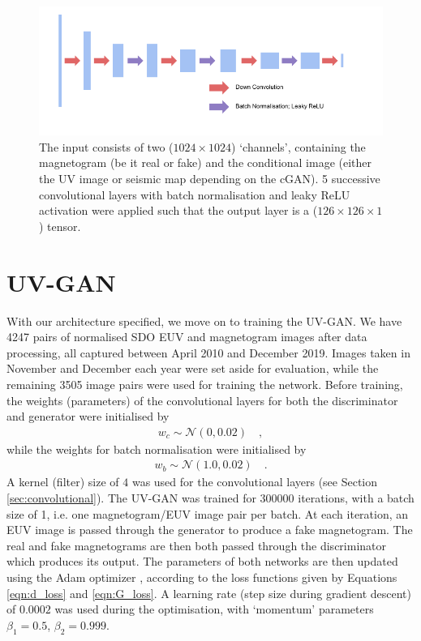 \documentclass[11pt,a4paper,onecolumn]{report}
\begin{document}
\begin{figure}
  \centering
  \includegraphics[width=\linewidth]{Descrim.pdf}
  \caption{
    The input consists of two ($1024\times 1024$) `channels', containing the
    magnetogram (be it real or fake) and the conditional image (either the UV
    image or seismic map depending on the cGAN). 5 successive convolutional
    layers with batch normalisation and leaky ReLU activation were applied such
    that the output layer is a ($126\times 126 \times 1$) tensor.
  }
  \label{fig:discrim_model}
\end{figure}



\section{UV-GAN}
With our architecture specified, we move on to training the UV-GAN. We have 4247
pairs of normalised SDO EUV and magnetogram images after data processing, all
captured between April 2010 and December 2019. Images taken in November and
December each year were set aside for evaluation, while the remaining 3505 image
pairs were used for training the network. Before training, the weights
(parameters) of the convolutional layers for both the discriminator and
generator were initialised by
\begin{align}
  w_c \sim \mathcal{N}\left(0, 0.02\right) \quad ,
\end{align}
while the weights for batch normalisation were initialised by
\begin{align}
  w_b \sim \mathcal{N}\left(1.0, 0.02\right) \quad .
\end{align}
A kernel (filter) size of $4$ was used for the convolutional layers (see Section
\ref{sec:convolutional}). The UV-GAN was trained for $300000$ iterations, with a
batch size of 1, i.e. one magnetogram/EUV image pair per batch. At each
iteration, an EUV image is passed through the generator to produce a fake
magnetogram. The real and fake magnetograms are then both passed through the
discriminator which produces its output. The parameters of both networks are
then updated using the Adam optimizer \citep{kingma_adam_2014}, according to the
loss functions given by Equations \ref{eqn:d_loss} and \ref{eqn:G_loss}. A
learning rate (step size during gradient descent) of $0.0002$ was used during
the optimisation, with `momentum' parameters $\beta_1 = 0.5$, $\beta_2 = 0.999$.\\
\end{document}
